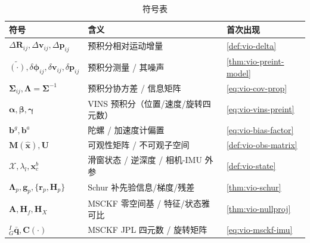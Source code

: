 \begin{table}[H]\centering\small
\caption{符号表}
\label{tab:vio-symbols}
\begin{tabular}{lll}
\toprule
符号 & 含义 & 首次出现 \\
\midrule
$\Delta\mathbf{R}_{ij},\Delta\mathbf{v}_{ij},\Delta\mathbf{p}_{ij}$ & 预积分相对运动增量 & \cref{def:vio-delta} \\
$\tilde{(\cdot)},\delta\boldsymbol{\phi}_{ij},\delta\mathbf{v}_{ij},\delta\mathbf{p}_{ij}$ & 预积分测量 / 其噪声 & \cref{thm:vio-preint-model} \\
$\boldsymbol{\Sigma}_{ij},\boldsymbol{\Lambda}=\boldsymbol{\Sigma}^{-1}$ & 预积分协方差 / 信息矩阵 & \cref{eq:vio-cov-prop} \\
$\boldsymbol{\alpha},\boldsymbol{\beta},\boldsymbol{\gamma}$ & VINS 预积分（位置/速度/旋转四元数）& \cref{eq:vio-vins-preint} \\
$\mathbf{b}^g,\mathbf{b}^a$ & 陀螺 / 加速度计偏置 & \cref{eq:vio-bias-factor} \\
$\mathbf{M}(\hat{\boldsymbol{x}}),\mathbf{U}$ & 可观性矩阵 / 不可观子空间 & \cref{def:vio-obs-matrix} \\
$\mathcal{X},\lambda_l,\mathbf{x}^b_c$ & 滑窗状态 / 逆深度 / 相机-IMU 外参 & \cref{def:vio-state} \\
$\boldsymbol{\Lambda}_p,\mathbf{g}_p,\{\mathbf{r}_p,\mathbf{H}_p\}$ & Schur 补先验信息/梯度/残差 & \cref{thm:vio-schur} \\
$\mathbf{A},\mathbf{H}_f,\mathbf{H}_X$ & MSCKF 零空间基 / 特征/状态雅可比 & \cref{thm:vio-nullproj} \\
${}^I_G\bar{\mathbf{q}},\mathbf{C}(\cdot)$ & MSCKF JPL 四元数 / 旋转矩阵 & \cref{eq:vio-msckf-imu} \\
\bottomrule
\end{tabular}
\end{table}


